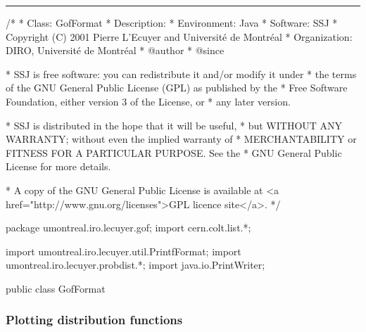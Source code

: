 \bigskip\hrule
\begin{code}
\begin{hide}
/*
 * Class:        GofFormat
 * Description:  
 * Environment:  Java
 * Software:     SSJ 
 * Copyright (C) 2001  Pierre L'Ecuyer and Université de Montréal
 * Organization: DIRO, Université de Montréal
 * @author       
 * @since

 * SSJ is free software: you can redistribute it and/or modify it under
 * the terms of the GNU General Public License (GPL) as published by the
 * Free Software Foundation, either version 3 of the License, or
 * any later version.

 * SSJ is distributed in the hope that it will be useful,
 * but WITHOUT ANY WARRANTY; without even the implied warranty of
 * MERCHANTABILITY or FITNESS FOR A PARTICULAR PURPOSE.  See the
 * GNU General Public License for more details.

 * A copy of the GNU General Public License is available at
   <a href="http://www.gnu.org/licenses">GPL licence site</a>.
 */
\end{hide}
package umontreal.iro.lecuyer.gof;
   import cern.colt.list.*;
\begin{hide}
import umontreal.iro.lecuyer.util.PrintfFormat;
import umontreal.iro.lecuyer.probdist.*;
import java.io.PrintWriter;\end{hide}

public class GofFormat\begin{hide} {
   private GofFormat() {} \end{hide}
\end{code}

\subsubsection*{Plotting distribution functions}

